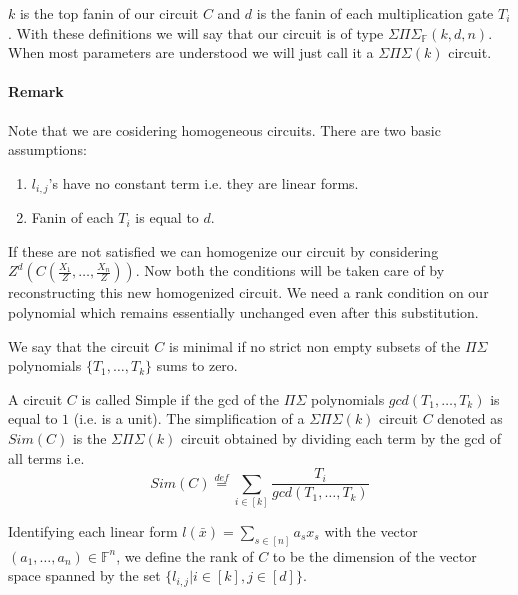 \documentclass[letterpaper,USenglish,numberwithinsect]{lipics}
\newcommand{\eqdef}{\stackrel{def}{=}}
\newcommand{\F}{\mathbb{F}}
\newcommand{\B}[1]{\bar{#1}}
\begin{document}
$k$ is the top fanin of our circuit $C$ and $d$ is the
fanin
of each multiplication gate $T_i$. With these definitions we will say that our
circuit
is of type $\Sigma\Pi\Sigma_\F(k,d,n)$. When most parameters are understood we will just call it a $\Sigma\Pi\Sigma(k)$ circuit.

\paragraph{Remark} \label{homogen} Note that we are cosidering homogeneous circuits. There are
two
basic assumptions:
\begin{enumerate}
 \item $l_{i,j}$'s have no constant term i.e. they are linear forms.
 \item Fanin of each $T_i$ is equal to $d$.
\end{enumerate}
If these are not satisfied we can homogenize our circuit by considering
$Z^d(C(\frac{X_1}{Z},\ldots,\frac{X_n}{Z}))$. Now both the conditions will
be taken care of by reconstructing this new homogenized circuit. We need a rank condition on
our polynomial which remains essentially unchanged even after this substitution.

\begin{definition}
 We say that the circuit $C$ is minimal if no strict non empty subsets of the
$\Pi\Sigma$
 polynomials $\{T_1,\ldots , T_k\}$ sums to zero.
\end{definition}

\begin{definition}
 A circuit $C$ is called Simple if the gcd of the $\Pi\Sigma$ polynomials
 $gcd(T_1,\ldots,T_k)$ is equal to $1$ (i.e. is a unit). The simplification of a
$\Sigma\Pi\Sigma(k)$ circuit
 $C$ denoted as $Sim(C)$ is the $\Sigma\Pi\Sigma(k)$ circuit obtained by dividing
each
 term by the gcd of all terms i.e.
 \[
  Sim(C) \eqdef
\sum\limits_{i\in[k]}\frac{T_i}{gcd(T_1,\ldots,T_k)}
 \]

\end{definition}

\begin{definition}
 Identifying each linear form $l(\B{x}) = \sum\limits_{s\in [n]}a_sx_s$ with the
 vector $(a_1, \ldots, a_n) \in \F^n$, we define the rank of $C$ to be the
dimension
 of the vector space spanned by the set $\{l_{i,j} | i \in [k], j \in [d]\}$.
\end{definition}
\end{document}
